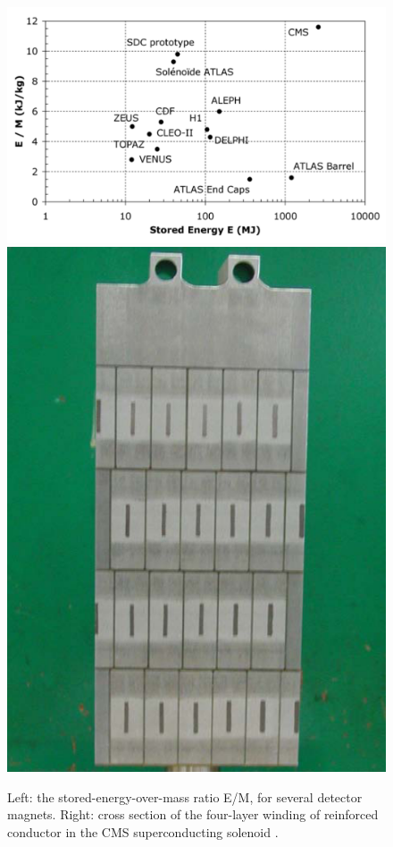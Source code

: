 \begin{figure}[hbtp]
\centering
\includegraphics[scale=0.25]{figures/lhc_and_cms/solenoid_energyOverMass_vs_mass.png}
\hspace{5 mm}
\includegraphics[scale=0.23]{figures/lhc_and_cms/solenoid_cross_section.png}
\caption{Left: the stored-energy-over-mass ratio E/M, for several detector magnets. Right: cross section of the four-layer winding of reinforced conductor in the CMS superconducting solenoid \cite{cms_experiment}.}
\label{solenoid_figures}
\end{figure}